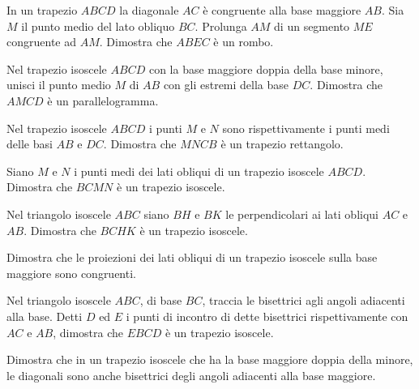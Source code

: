 \begin{multicols}{2}
\begin{esercizio}
\label{ese:4.27}
In un trapezio \(ABCD\) la diagonale \(AC\) è congruente alla base 
maggiore \(AB\). Sia \(M\) il punto medio del lato obliquo \(BC\). Prolunga 
\(AM\) di un segmento \(ME\) congruente ad \(AM\). Dimostra che \(ABEC\) è un 
rombo.
\end{esercizio}

\begin{esercizio}
\label{ese:4.28}
Nel trapezio isoscele \(ABCD\) con la base maggiore doppia della base 
minore, unisci il punto medio \(M\) di \(AB\) con gli estremi della base 
\(DC\). Dimostra che \(AMCD\) è un parallelogramma.
\end{esercizio}

\begin{esercizio}
\label{ese:4.29}
Nel trapezio isoscele \(ABCD\) i punti \(M\) e \(N\) sono rispettivamente i 
punti medi delle basi \(AB\) e \(DC\). Dimostra che \(MNCB\) è un trapezio 
rettangolo.
\end{esercizio}

\begin{esercizio}
\label{ese:4.30}
Siano \(M\) e \(N\) i punti medi dei lati obliqui di un trapezio isoscele 
\(ABCD\). Dimostra che \(BCMN\) è un trapezio isoscele.
\end{esercizio}

\begin{esercizio}
\label{ese:4.31}
Nel triangolo isoscele \(ABC\) siano \(BH\) e \(BK\) le perpendicolari ai 
lati obliqui \(AC\) e \(AB\). Dimostra che \(BCHK\) è un trapezio isoscele.
\end{esercizio}

\begin{esercizio}
\label{ese:4.32}
Dimostra che le proiezioni dei lati obliqui di un trapezio isoscele 
sulla base maggiore sono congruenti.
\end{esercizio}

\begin{esercizio}
\label{ese:4.33}
Nel triangolo isoscele \(ABC\), di base \(BC\), traccia le bisettrici 
agli angoli adiacenti alla base. Detti \(D\) ed \(E\) i punti di incontro 
di dette bisettrici rispettivamente con \(AC\) e \(AB\), dimostra che 
\(EBCD\) è un trapezio isoscele.
\end{esercizio}

\begin{esercizio}
\label{ese:4.34}
Dimostra che in un trapezio isoscele che ha la base maggiore doppia 
della minore, le diagonali sono anche bisettrici degli angoli 
adiacenti alla base maggiore.
\end{esercizio}


\end{multicols}
